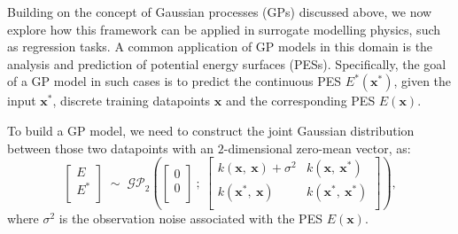 Building on the concept of Gaussian processes (GPs) discussed above, we now explore how this framework can be applied in surrogate modelling physics, such as regression tasks.
A common application of GP models in this domain is the analysis and prediction of potential energy surfaces (PESs). 
Specifically, the goal of a GP model in such cases is to predict the continuous PES $E^{*}(\mathbf{x}^{*})$, given the input $\mathbf{x}^{*}$, discrete training datapoints $\mathbf{x}$ and the corresponding PES $E(\mathbf{x})$.

To build a GP model, we need to construct the joint Gaussian distribution between those two datapoints with an $2$-dimensional zero-mean vector, as:
\begin{equation}
    \label{equ:2.33}
         \begin{bmatrix}
         E\\
         E^{*}\\
         \end{bmatrix}
        \;\mathtt{\sim}\;
        \mathcal{GP}_{2}\left(
        \begin{bmatrix}
         0\\
         0\\
         \end{bmatrix}\:
         ;\:\begin{bmatrix}
             k(\mathbf{x},\:\mathbf{x})+\sigma^{2} & k(\mathbf{x},\:\mathbf{x}^{*})\\
             k(\mathbf{x}^{*},\:\mathbf{x}) & k(\mathbf{x}^{*},\:\mathbf{x}^{*})\\
         \end{bmatrix}\right),
\end{equation}  
where $\sigma^{2}$ is the observation noise associated with the PES $E(\mathbf{x})$.

